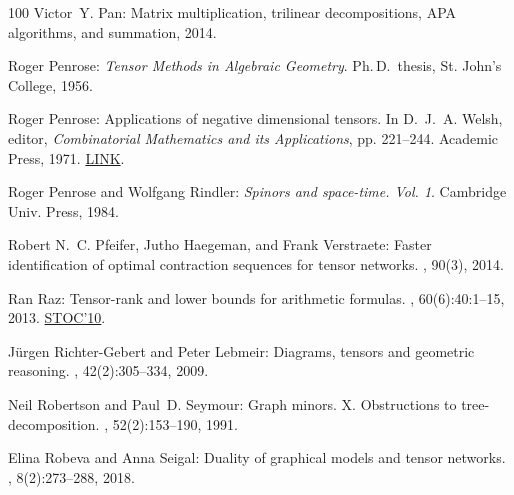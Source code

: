 \begin{thebibliography}{100}
{\sc Victor~Y. Pan}: Matrix multiplication, trilinear decompositions, {APA}
  algorithms, and summation, 2014.

{\sc Roger Penrose}: {\em Tensor Methods in Algebraic Geometry}.
\newblock Ph.\,D.\ thesis, St. John's College, 1956.

{\sc Roger Penrose}: Applications of negative dimensional tensors.
\newblock In {\sc D.~J.~A. Welsh}, editor, {\em Combinatorial {M}athematics and
  its {A}pplications}, pp. 221--244. Academic Press, 1971.
\newblock
  \href{https://www.mscs.dal.ca/~selinger/papers/graphical-bib/public/Penrose-applications-of-negative-dimensional-tensors.pdf}{LINK}.

{\sc Roger Penrose and Wolfgang Rindler}: {\em Spinors and space-time. {V}ol.
  1}.
\newblock Cambridge Univ. Press, 1984.

{\sc Robert N.~C. Pfeifer, Jutho Haegeman, and Frank Verstraete}: Faster
  identification of optimal contraction sequences for tensor networks.
, 90(3), 2014.

{\sc Ran Raz}: Tensor-rank and lower bounds for arithmetic formulas.
, 60(6):40:1--15, 2013.
\newblock \prelim \href{https://doi.org/10.1145/1806689.1806780}{STOC'10}.

{\sc J{\"{u}}rgen Richter-Gebert and Peter Lebmeir}: Diagrams, tensors and
  geometric reasoning.
, 42(2):305--334, 2009.
\newblock [\epfmtdoi{10.1007/s00454-009-9188-9}]

{\sc Neil Robertson and Paul~D. Seymour}: Graph minors. {X}. {O}bstructions to
  tree-decomposition.
, 52(2):153--190, 1991.
\newblock [\epfmtdoi{10.1016/0095-8956(91)90061-N}]

{\sc Elina Robeva and Anna Seigal}: Duality of graphical models and tensor
  networks.
, 8(2):273--288, 2018.


\end{thebibliography}
